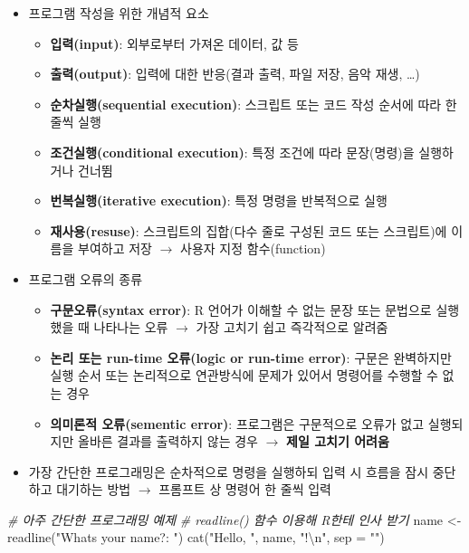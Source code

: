 \documentclass[
  11pt,
]{krantz}
\newenvironment{Shaded}{\begin{snugshade}}{\end{snugshade}}
\newcommand{\AttributeTok}[1]{\textcolor[rgb]{0.61,0.61,0.61}{#1}}
\newcommand{\CommentTok}[1]{\textcolor[rgb]{0.37,0.37,0.37}{\textit{#1}}}
\newcommand{\FunctionTok}[1]{\textcolor[rgb]{0,0,0}{#1}}
\newcommand{\NormalTok}[1]{#1}
\newcommand{\OtherTok}[1]{\textcolor[rgb]{0.37,0.37,0.37}{#1}}
\newcommand{\SpecialCharTok}[1]{\textcolor[rgb]{0,0,0}{#1}}
\newcommand{\StringTok}[1]{\textcolor[rgb]{0.5,0.5,0.5}{#1}}
\providecommand{\tightlist}{%
  \setlength{\itemsep}{0pt}\setlength{\parskip}{0pt}}
\begin{document}
\normalsize

\begin{itemize}
\tightlist
\item
  프로그램 작성을 위한 개념적 요소

  \begin{itemize}
  \tightlist
  \item
    \textbf{입력(input)}: 외부로부터 가져온 데이터, 값 등
  \item
    \textbf{출력(output)}: 입력에 대한 반응(결과 출력, 파일 저장, 음악 재생, \ldots)
  \item
    \textbf{순차실행(sequential execution)}: 스크립트 또는 코드 작성 순서에 따라 한줄씩 실행
  \item
    \textbf{조건실행(conditional execution)}: 특정 조건에 따라 문장(명령)을 실행하거나 건너뜀
  \item
    \textbf{번복실행(iterative execution)}: 특정 명령을 반복적으로 실행
  \item
    \textbf{재사용(resuse)}: 스크립트의 집합(다수 줄로 구성된 코드 또는 스크립트)에 이름을 부여하고 저장 \(\rightarrow\) 사용자 지정 함수(function)
  \end{itemize}
\item
  프로그램 오류의 종류

  \begin{itemize}
  \tightlist
  \item
    \textbf{구문오류(syntax error)}: R 언어가 이해할 수 없는 문장 또는 문법으로 실행했을 때 나타나는 오류 \(\rightarrow\) 가장 고치기 쉽고 즉각적으로 알려줌
  \item
    \textbf{논리 또는 run-time 오류(logic or run-time error)}: 구문은 완벽하지만 실행 순서 또는 논리적으로 연관방식에 문제가 있어서 명령어를 수행할 수 없는 경우
  \item
    \textbf{의미론적 오류(sementic error)}: 프로그램은 구문적으로 오류가 없고 실행되지만 올바른 결과를 출력하지 않는 경우 \(\rightarrow\) \textbf{제일 고치기 어려움}
  \end{itemize}
\item
  가장 간단한 프로그래밍은 순차적으로 명령을 실행하되 입력 시 흐름을 잠시 중단하고 대기하는 방법 \(\rightarrow\) 프롬프트 상 명령어 한 줄씩 입력
\end{itemize}

\footnotesize

\begin{Shaded}
\begin{Highlighting}[]
\CommentTok{\# 아주 간단한 프로그래밍 예제}
\CommentTok{\# readline() 함수 이용해 R한테 인사 받기}
\NormalTok{name }\OtherTok{\textless{}{-}} \FunctionTok{readline}\NormalTok{(}\StringTok{"What\textquotesingle{}s your name?: "}\NormalTok{)}
\FunctionTok{cat}\NormalTok{(}\StringTok{"Hello, "}\NormalTok{, name, }\StringTok{"!}\SpecialCharTok{\textbackslash{}n}\StringTok{"}\NormalTok{, }\AttributeTok{sep =} \StringTok{""}\NormalTok{)}
\end{Highlighting}
\end{Shaded}
\end{document}
